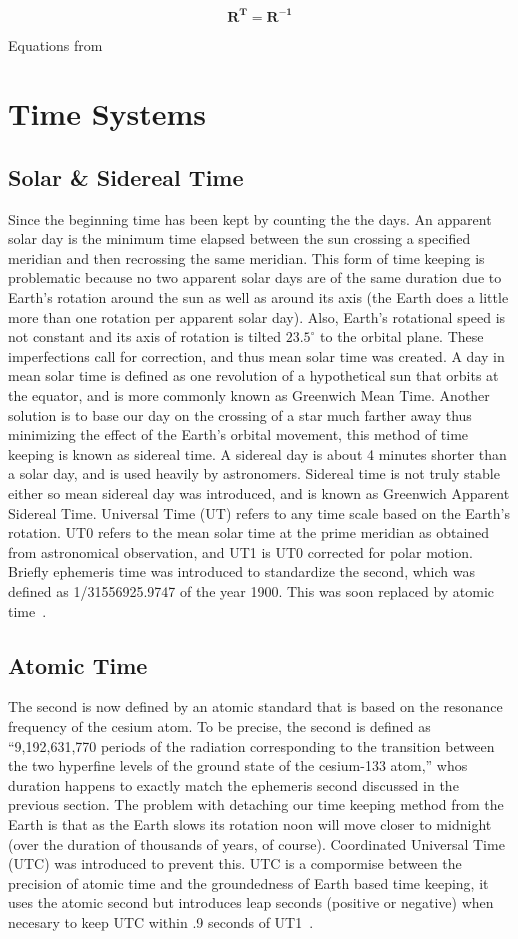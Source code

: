 \begin{bibunit}
\[ \mathbf{R^{T}}=\mathbf{R^{-1}} \]

Equations from \cite[pp. 81-82]{battin:imma}

\section{Time Systems}
\subsection{Solar \& Sidereal Time}
Since the  beginning time has been kept by counting the the days. An apparent solar day is the minimum time elapsed between the sun crossing a specified meridian and then recrossing the same meridian. This form of time keeping is problematic because no two apparent solar days are of the same duration due to Earth's rotation around the sun as well as around its axis (the Earth does a little more than one rotation per apparent solar day). Also, Earth's rotational speed is not constant and its axis of rotation is tilted $23.5^{\circ}$ to the orbital plane. These imperfections call for correction, and thus mean solar time was created. A day in mean solar time is defined as one revolution of a hypothetical sun that orbits at the equator, and is more commonly known as Greenwich Mean Time. Another solution is to base our day on the crossing of a star much farther away thus minimizing the effect of the Earth's orbital movement, this method of time keeping is known as sidereal time. A sidereal day is about 4 minutes shorter than a solar day, and is used heavily by astronomers. Sidereal time is not truly stable either so mean sidereal day was introduced, and is known as Greenwich Apparent Sidereal Time. Universal Time (UT) refers to any time scale based on the Earth's rotation. UT0 refers to the mean solar time at the prime meridian as obtained from astronomical observation, and UT1 is UT0 corrected for polar motion. Briefly ephemeris time was introduced to standardize the second, which was defined as 1/31556925.9747 of the year 1900. This was soon replaced by atomic time~\cite[pp. 84-86]{me:gsmp}.
\subsection{Atomic Time}
The second is now defined by an atomic standard that is based on the resonance frequency of the cesium atom. To be precise, the second is defined as ``9,192,631,770 periods of the radiation corresponding to the transition between the two hyperfine levels of the ground state of the cesium-133 atom,'' whos duration happens to exactly match the ephemeris second discussed in the previous section. The problem with detaching our time keeping method from the Earth is that as the Earth slows its rotation noon will move closer to midnight (over the duration of thousands of years, of course). Coordinated Universal Time (UTC) was introduced to prevent this. UTC is a compormise between the precision of atomic time and the groundedness of Earth based time keeping, it uses the atomic second but introduces leap seconds (positive or negative) when necesary to keep UTC within .9 seconds of UT1~\cite[pp. 86-87]{me:gsmp}.

\end{bibunit}
